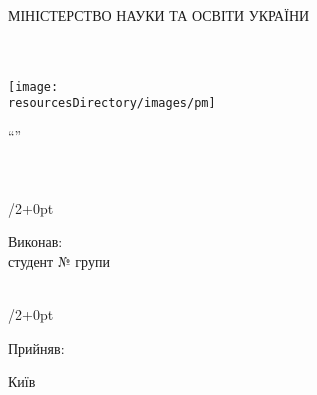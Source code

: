 
\newlength{\rightshift}
\setlength{\rightshift}{35pt}

\thispagestyle{empty}

{\sffamily
\begin{Center}
	{\LARGE{}МІНІСТЕРСТВО НАУКИ ТА ОСВІТИ УКРАЇНИ\\
	\university{}\\}
	{\Large\faculty{}\\\department{}}
\end{Center}

\vspace*{\fill}

\begin{Center}
	\texttt{[image: \\resourcesDirectory/images/pm]}\\
\end{Center}

\vspace*{\fill}

\begin{Center}
	\Large
	\enquote{\subjectname}\\
	\jobtitle{} \prodnumber{}\\
	\proddate{}\\
\end{Center}

\vspace*{\fill}

\begin{adjustwidth}{\textwidth/2+\rightshift}{0pt}
	\begin{FlushLeft}
		\large
		Виконав:\\
		студент №\studentnumber{} групи \shortdepartment{} \groupnumber{} \shortuniversity{}\\
		\studentname{}\\
	\end{FlushLeft}
\end{adjustwidth}

\vspace{1cm}

\begin{adjustwidth}{\textwidth/2+\rightshift}{0pt}
	\begin{FlushLeft}
		\large
		Прийняв:\\
		\teachername{}
	\end{FlushLeft}
\end{adjustwidth}

\vspace*{\fill}

\begin{Center}
	Київ \the\year{}
\end{Center}
}

\pagebreak
\hypertarget{tocLink}{{\sffamily\tableofcontents}}
\pagebreak